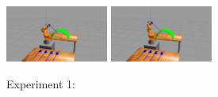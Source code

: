\begin{center}
\begin{figure}[!htb]
\includegraphics[width=0.3\textwidth]{images/robot_planner1/robot_planner1_8}
\includegraphics[width=0.3\textwidth]{images/robot_planner1/robot_planner1_9}\\
\caption{Experiment 1:}
\end{figure}
\end{center}

